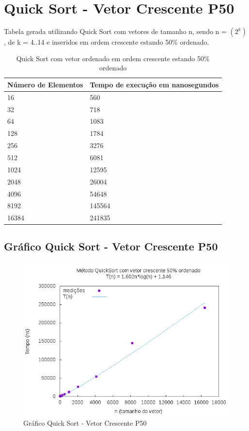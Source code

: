 \documentclass[12pt,a4paper,twoside]{report}
\begin{document}
\section{Quick Sort - Vetor Crescente P50}
Tabela gerada utilizando Quick Sort com vetores de tamanho n, sendo n = $(2^k)$, de k = 4..14 e inseridos em ordem crescente estando 50\% ordenado.
\begin{table}[H]
\centering
\caption{Quick Sort com vetor ordenado em ordem crescente estando 50\% ordenado}
\label{my-label}
\begin{tabular}{|l|l|}
\hline
\multicolumn{1}{|c|}{\textbf{Número de Elementos}} & \multicolumn{1}{c|}{\textbf{Tempo de execução em nanosegundos}} \\ \hline
16 & 560 \\ \hline
32 & 718 \\ \hline
64 & 1083 \\ \hline
128 & 1784 \\ \hline
256 & 3276 \\ \hline
512 & 6081 \\ \hline
1024 & 12595 \\ \hline
2048 & 26004 \\ \hline
4096 & 54648 \\ \hline
8192 & 145564 \\ \hline
16384 & 241835 \\ \hline
\end{tabular}
\end{table}

\subsection{Gráfico Quick Sort - Vetor Crescente P50}
\begin{figure}[H]
    \centering
    \includegraphics[width=0.7\linewidth]{graficos/QuickSort/vIntCrescenteP50/vIntCrescenteP50.png}
  \caption{Gráfico Quick Sort - Vetor Crescente P50}
\end{figure}
\end{document}
